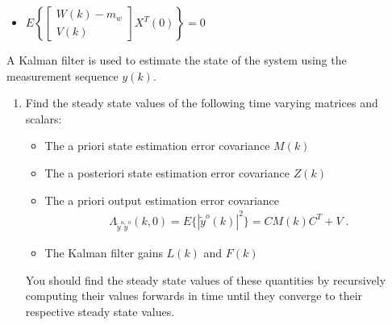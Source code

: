\documentclass[letterpaper,12pt]{article}
\begin{document}
\begin{enumerate}
\begin{itemize}
    \item
    $E \left\{ \begin{bmatrix}
        W(k) - m_w  \\
        V(k)
    \end{bmatrix} X^T(0) \right\} = 0$

\end{itemize}
A Kalman filter is used to estimate the state of the system using the measurement sequence $y(k)$.

\begin{enumerate}

    \item
    Find the steady state values of the following time varying matrices and scalars:
    \begin{itemize}

        \item
        The a priori state estimation error covariance $M(k)$

        \item
        The a posteriori state estimation error covariance $Z(k)$

        \item
        The a priori output estimation error covariance
        \begin{align*}
            \Lambda_{\tilde{y}^o \tilde{y}^o}(k,0) = E \{ | \tilde{y}^o(k) |^2 \} = CM(k) C^T + V \; .
        \end{align*}

        \item
        The Kalman filter gains $L(k)$ and $F(k)$

    \end{itemize}
    You should find the steady state values of these quantities by recursively computing their values forwards in time until they converge to their respective steady state values.


\end{enumerate}
\end{enumerate}
\end{document}
